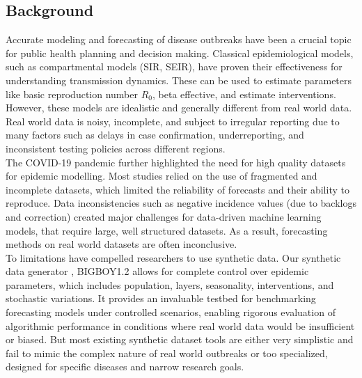 \documentclass[11pt,a4paper]{article}
\theoremstyle{remark}\newtheorem{remark}{Remark}
\begin{document}
\subsection{Background}
Accurate modeling and forecasting of disease outbreaks have been a crucial topic for public health planning and decision making. Classical epidemiological models, such as compartmental models (SIR, SEIR)\cite{hethcote}, have proven their effectiveness for understanding transmission dynamics. These can be used to estimate parameters like basic reproduction number $R_0$, beta effective, and estimate interventions. However, these models are idealistic and generally different from real world data. Real world data is noisy, incomplete, and subject to irregular reporting due to many factors such as delays in case confirmation, underreporting, and inconsistent testing policies across different regions\cite{holmdahl_buckee}. \\
The COVID-19 pandemic further highlighted the need for high quality datasets for epidemic modelling\cite{chinazzi_covid}. Most studies relied on the use of fragmented and incomplete datasets, which limited the reliability of forecasts and their ability to reproduce. Data inconsistencies such as negative incidence values (due to backlogs and correction) created major challenges for data-driven machine learning models, that require large, well structured datasets. As a result, forecasting methods on real world datasets are often inconclusive. \\
To limitations have compelled researchers to use synthetic data. Our synthetic data generator , BIGBOY1.2 allows for complete control over epidemic parameters, which includes population, layers, seasonality, interventions, and stochastic variations. It provides an invaluable testbed for benchmarking forecasting models under controlled scenarios, enabling rigorous evaluation of algorithmic performance in conditions where real world data would be insufficient or biased. But most existing synthetic dataset tools are either very simplistic and fail to mimic the complex nature of real world outbreaks or too specialized, designed for specific diseases and narrow research goals\cite{venkatramanan2020}.
\end{document}
